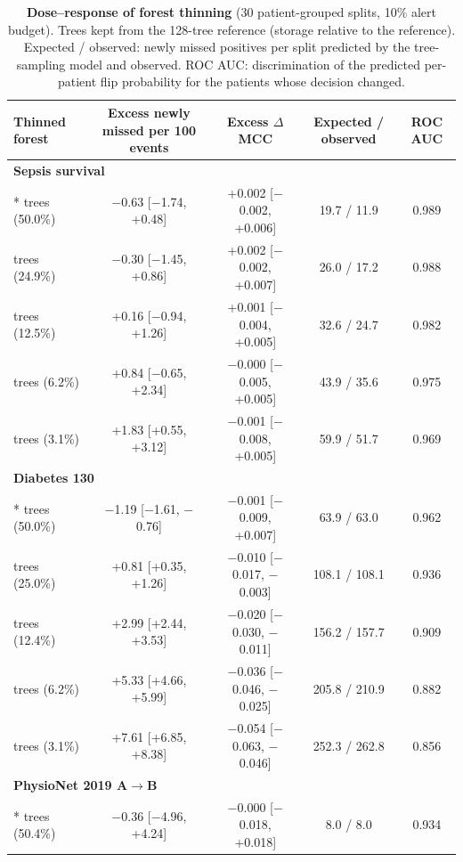 \begin{table}[!htb]
\centering
\caption{\textbf{Dose--response of forest thinning} (30 patient-grouped splits, 10\% alert budget). Trees kept from the 128-tree reference (storage relative to the reference). Expected / observed: newly missed positives per split predicted by the tree-sampling model and observed. ROC AUC: discrimination of the predicted per-patient flip probability for the patients whose decision changed.}
\label{tab:DOSE}
{\scriptsize
\begin{tabular}{lcccc}
\toprule
Thinned forest & Excess newly missed per 100 events & Excess $\Delta$MCC & Expected / observed & ROC AUC \\
\midrule
\multicolumn{5}{l}{\textbf{Sepsis survival}} \\*
\quad 64 trees (50.0\%) & $-$0.63 [$-$1.74, +0.48] & +0.002 [$-$0.002, +0.006] & 19.7 / 11.9 & 0.989 \\
\quad 32 trees (24.9\%) & $-$0.30 [$-$1.45, +0.86] & +0.002 [$-$0.002, +0.007] & 26.0 / 17.2 & 0.988 \\
\quad 16 trees (12.5\%) & +0.16 [$-$0.94, +1.26] & +0.001 [$-$0.004, +0.005] & 32.6 / 24.7 & 0.982 \\
\quad 8 trees (6.2\%) & +0.84 [$-$0.65, +2.34] & $-$0.000 [$-$0.005, +0.005] & 43.9 / 35.6 & 0.975 \\
\quad 4 trees (3.1\%) & +1.83 [+0.55, +3.12] & $-$0.001 [$-$0.008, +0.005] & 59.9 / 51.7 & 0.969 \\
\midrule
\multicolumn{5}{l}{\textbf{Diabetes 130}} \\*
\quad 64 trees (50.0\%) & $-$1.19 [$-$1.61, $-$0.76] & $-$0.001 [$-$0.009, +0.007] & 63.9 / 63.0 & 0.962 \\
\quad 32 trees (25.0\%) & +0.81 [+0.35, +1.26] & $-$0.010 [$-$0.017, $-$0.003] & 108.1 / 108.1 & 0.936 \\
\quad 16 trees (12.4\%) & +2.99 [+2.44, +3.53] & $-$0.020 [$-$0.030, $-$0.011] & 156.2 / 157.7 & 0.909 \\
\quad 8 trees (6.2\%) & +5.33 [+4.66, +5.99] & $-$0.036 [$-$0.046, $-$0.025] & 205.8 / 210.9 & 0.882 \\
\quad 4 trees (3.1\%) & +7.61 [+6.85, +8.38] & $-$0.054 [$-$0.063, $-$0.046] & 252.3 / 262.8 & 0.856 \\
\midrule
\multicolumn{5}{l}{\textbf{PhysioNet 2019 A$\rightarrow$B}} \\*
\quad 64 trees (50.4\%) & $-$0.36 [$-$4.96, +4.24] & $-$0.000 [$-$0.018, +0.018] & 8.0 / 8.0 & 0.934 \\

\end{tabular}}
\end{table}
